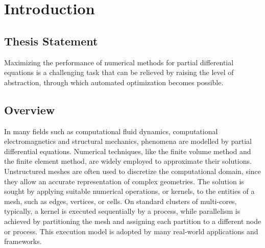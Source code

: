 \chapter{Introduction}

\section{Thesis Statement}




Maximizing the performance of numerical methods for partial differential equations is a challenging task that can be relieved by raising the level of abstraction, through which automated optimization becomes possible. 

\section{Overview}
In many fields such as computational fluid dynamics, computational electromagnetics and structural mechanics, phenomena are modelled by partial differential equations. Numerical techniques, like the finite volume method and the finite element method, are widely employed to approximate their solutions. Unstructured meshes are often used to discretize the computational domain, since they allow an accurate representation of complex geometries. The solution is sought by applying suitable numerical operations, or kernels, to the entities of a mesh, such as edges, vertices, or cells. On standard clusters of multi-cores, typically, a kernel is executed sequentially by a process, while parallelism is achieved by partitioning the mesh and assigning each partition to a different node or process. This execution model is adopted by many real-world applications and frameworks.

